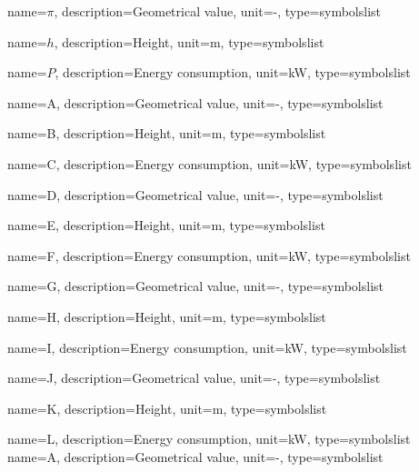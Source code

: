 
 {
    name=$\pi$,
    description=Geometrical value,
    unit=-,
    type=symbolslist
}

 {
    name={$h$},
    description={Height},
    unit={\si{m}},
    type=symbolslist
}

 {
    name={$P$},
    description={Energy consumption},
    unit={\si{kW}},
    type={symbolslist}
}

 {
    name=A,
    description=Geometrical value,
    unit=-,
    type=symbolslist
}

 {
    name=B,
    description={Height},
    unit={\si{m}},
    type=symbolslist
}

 {
    name=C,
    description={Energy consumption},
    unit={\si{kW}},
    type={symbolslist}
}

 {
    name=D,
    description=Geometrical value,
    unit=-,
    type=symbolslist
}

 {
    name=E,
    description={Height},
    unit={\si{m}},
    type=symbolslist
}

 {
    name=F,
    description={Energy consumption},
    unit={\si{kW}},
    type={symbolslist}
}


 {
    name=G,
    description=Geometrical value,
    unit=-,
    type=symbolslist
}

 {
    name=H,
    description={Height},
    unit={\si{m}},
    type=symbolslist
}

 {
    name=I,
    description={Energy consumption},
    unit={\si{kW}},
    type={symbolslist}
}

 {
    name=J,
    description=Geometrical value,
    unit=-,
    type=symbolslist
}

 {
    name=K,
    description={Height},
    unit={\si{m}},
    type=symbolslist
}

 {
    name=L,
    description={Energy consumption},
    unit={\si{kW}},
    type={symbolslist}
}
 {
    name=A,
    description=Geometrical value,
    unit=-,
    type=symbolslist
}

